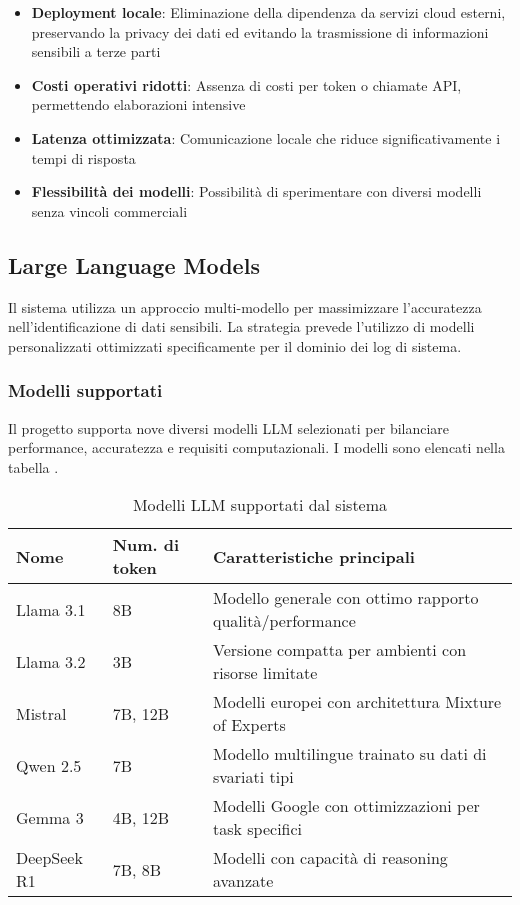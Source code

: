 \documentclass[12pt]{report}
\begin{document}
\begin{itemize}
    \item \textbf{Deployment locale}: Eliminazione della dipendenza da servizi cloud esterni, preservando la privacy dei dati ed evitando la trasmissione di informazioni sensibili a terze parti
    \item \textbf{Costi operativi ridotti}: Assenza di costi per token o chiamate API, permettendo elaborazioni intensive
    \item \textbf{Latenza ottimizzata}: Comunicazione locale che riduce significativamente i tempi di risposta
    \item \textbf{Flessibilità dei modelli}: Possibilità di sperimentare con diversi modelli senza vincoli commerciali
\end{itemize}

\subsection{Large Language Models}
\label{subsec:llm}

Il sistema utilizza un approccio multi-modello per massimizzare l'accuratezza nell'identificazione di dati sensibili. La strategia prevede l'utilizzo di modelli personalizzati ottimizzati specificamente per il dominio dei log di sistema.

\subsubsection{Modelli supportati}
Il progetto supporta nove diversi modelli LLM selezionati per bilanciare performance, accuratezza e requisiti computazionali. I modelli sono elencati nella tabella .

\begin{table}[h!]
    \centering
    \begin{tabular}{|p{}|p{}|p{}|}
        \hline
        \textbf{Nome} & \textbf{Num. di token} & \textbf{Caratteristiche principali}                  \\ \hline
        Llama 3.1     & 8B                     & Modello generale con ottimo rapporto qualità/performance   \\ \hline
        Llama 3.2     & 3B                     & Versione compatta per ambienti con risorse limitate  \\ \hline
        Mistral       & 7B, 12B                & Modelli europei con architettura Mixture of Experts  \\ \hline
        Qwen 2.5      & 7B                     & Modello multilingue trainato su dati di svariati tipi \\ \hline
        Gemma 3       & 4B, 12B                & Modelli Google con ottimizzazioni per task specifici \\ \hline
        DeepSeek R1   & 7B, 8B                 & Modelli con capacità di reasoning avanzate           \\ \hline
    \end{tabular}
    \caption{Modelli LLM supportati dal sistema}
    \label{tab:modelli_llm}
\end{table}
\end{document}
